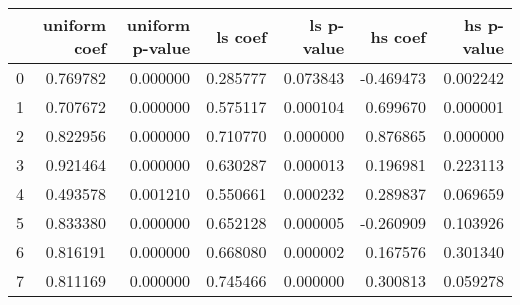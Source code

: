 \begin{tabular}{lrrrrrr}
\toprule
 & uniform coef & uniform p-value & ls coef & ls p-value & hs coef & hs p-value \\
\midrule
0 & 0.769782 & 0.000000 & 0.285777 & 0.073843 & -0.469473 & 0.002242 \\
1 & 0.707672 & 0.000000 & 0.575117 & 0.000104 & 0.699670 & 0.000001 \\
2 & 0.822956 & 0.000000 & 0.710770 & 0.000000 & 0.876865 & 0.000000 \\
3 & 0.921464 & 0.000000 & 0.630287 & 0.000013 & 0.196981 & 0.223113 \\
4 & 0.493578 & 0.001210 & 0.550661 & 0.000232 & 0.289837 & 0.069659 \\
5 & 0.833380 & 0.000000 & 0.652128 & 0.000005 & -0.260909 & 0.103926 \\
6 & 0.816191 & 0.000000 & 0.668080 & 0.000002 & 0.167576 & 0.301340 \\
7 & 0.811169 & 0.000000 & 0.745466 & 0.000000 & 0.300813 & 0.059278 \\
\bottomrule
\end{tabular}

